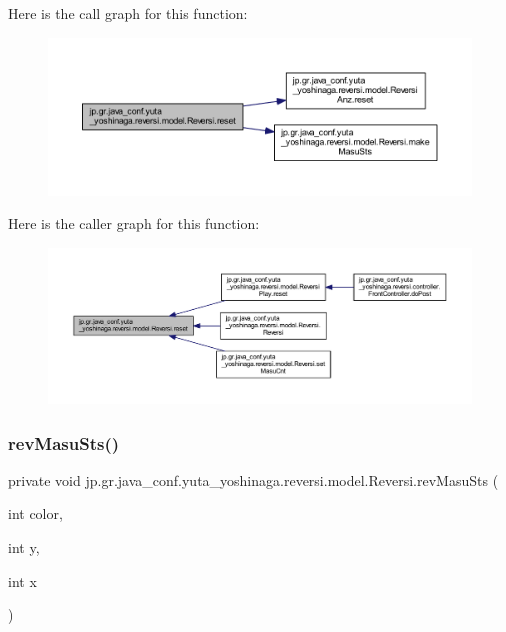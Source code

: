 Here is the call graph for this function\+:\nopagebreak
\begin{figure}[H]
\begin{center}
\leavevmode
\includegraphics[width=350pt]{classjp_1_1gr_1_1java__conf_1_1yuta__yoshinaga_1_1reversi_1_1model_1_1_reversi_a497552844cbae36207f2d8c836a26b8e_cgraph}
\end{center}
\end{figure}
Here is the caller graph for this function\+:\nopagebreak
\begin{figure}[H]
\begin{center}
\leavevmode
\includegraphics[width=350pt]{classjp_1_1gr_1_1java__conf_1_1yuta__yoshinaga_1_1reversi_1_1model_1_1_reversi_a497552844cbae36207f2d8c836a26b8e_icgraph}
\end{center}
\end{figure}
\mbox{\label{classjp_1_1gr_1_1java__conf_1_1yuta__yoshinaga_1_1reversi_1_1model_1_1_reversi_a3c63579c27513dffc555416388f8530a}} 
\subsubsection{\texorpdfstring{rev\+Masu\+Sts()}{revMasuSts()}}
{\footnotesize\ttfamily private void jp.\+gr.\+java\+\_\+conf.\+yuta\+\_\+yoshinaga.\+reversi.\+model.\+Reversi.\+rev\+Masu\+Sts (\begin{DoxyParamCaption}\item[{int}]{color,  }\item[{int}]{y,  }\item[{int}]{x }\end{DoxyParamCaption})\hspace{0.3cm}{\ttfamily [private]}}



